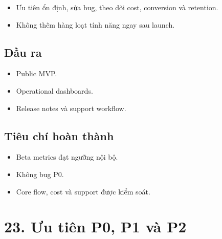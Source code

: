 \documentclass[
  11pt,
  a4paper,
]{article}
\begin{document}
\begin{itemize}
\item
  Ưu tiên ổn định, sửa bug, theo dõi cost, conversion và retention.
\item
  Không thêm hàng loạt tính năng ngay sau launch.
\end{itemize}

\subsection{Đầu ra}\label{ux111ux1ea7u-ra-16}

\begin{itemize}
\item
  Public MVP.
\item
  Operational dashboards.
\item
  Release notes và support workflow.
\end{itemize}

\subsection{Tiêu chí hoàn
thành}\label{tiuxeau-chuxed-houxe0n-thuxe0nh-16}

\begin{itemize}
\item
  Beta metrics đạt ngưỡng nội bộ.
\item
  Không bug P0.
\item
  Core flow, cost và support được kiểm soát.
\end{itemize}

\section{23. Ưu tiên P0, P1 và P2}\label{ux1b0u-tiuxean-p0-p1-vuxe0-p2}
\end{document}
